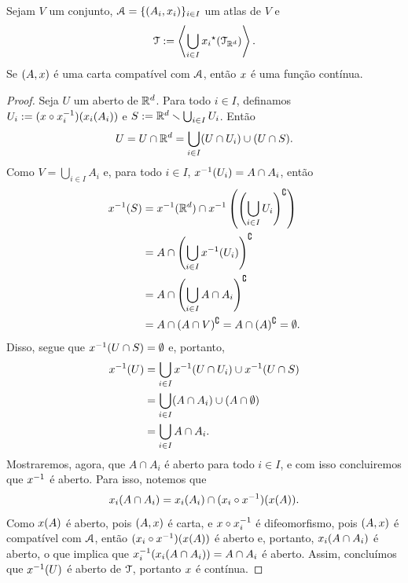 \begin{proposition}
Sejam $V$ um conjunto, $\mathcal{A}=\{(A_i,x_i)\}_{i \in I}$ um atlas de $V$ e
	\begin{equation*}
	\mathcal{T} := \left\langle \bigcup_{i \in I} {x_i}^\star(\mathcal{T}_{\mathbb{R}^d}) \right\rangle.
	\end{equation*}
Se $(A,x)$ é uma carta compatível com $\mathcal{A}$, então $x$ é uma função contínua.
\end{proposition}
\begin{proof}
Seja $U$ um aberto de $\mathbb{R}^d$. Para todo $i \in I$, definamos $U_i := (x \circ x_i^{-1})(x_i(A_i))$ e $S := \mathbb{R}^d \smallsetminus \bigcup_{i \in I} U_i$. Então
	\begin{equation*}
	U = U \cap \mathbb{R}^d = \bigcup_{i \in I} (U \cap U_i) \cup (U \cap S).
	\end{equation*}
Como $V=\bigcup_{i \in I} A_i$ e, para todo $i \in I$, $x^{-1}(U_i) = A \cap A_i$, então
	\begin{align*}
	x^{-1}(S) &= x^{-1}(\mathbb{R}^d) \cap x^{-1}\left(\left(\bigcup_{i \in I} U_i\right)^\complement\right) \\
		&= A \cap \left(\bigcup_{i \in I} x^{-1}(U_i) \right)^\complement \\
		&= A \cap \left(\bigcup_{i \in I} A \cap A_i \right)^\complement \\
		&= A \cap (A \cap V)^\complement = A \cap (A)^\complement = \emptyset.
	\end{align*}
Disso, segue que $x^{-1}(U \cap S)=\emptyset$ e, portanto,
	\begin{align*}
	x^{-1}(U) &= \bigcup_{i \in I} x^{-1}(U \cap U_i) \cup x^{-1}(U \cap S) \\
		&= \bigcup_{i \in I} (A \cap A_i) \cup (A \cap\emptyset) \\
		&= \bigcup_{i \in I} A \cap A_i.
	\end{align*}
Mostraremos, agora, que $A \cap A_i$ é aberto para todo $i \in I$, e com isso concluiremos que $x^{-1}$ é aberto. Para isso, notemos que
	\begin{equation*}
	x_i(A \cap A_i) = x_i(A_i) \cap (x_i \circ x^{-1})(x(A)).
	\end{equation*}
Como $x(A)$ é aberto, pois $(A,x)$ é carta, e $x \circ x_i^{-1}$ é difeomorfismo, pois $(A,x)$ é compatível com $\mathcal{A}$, então $(x_i \circ x^{-1})(x(A))$ é aberto e, portanto, $x_i(A \cap A_i)$ é aberto, o que implica que $x_i^{-1}(x_i(A \cap A_i)) = A \cap A_i$ é aberto. Assim, concluímos que $x^{-1}(U)$ é aberto de $\mathcal{T}$, portanto $x$ é contínua.
\end{proof}

